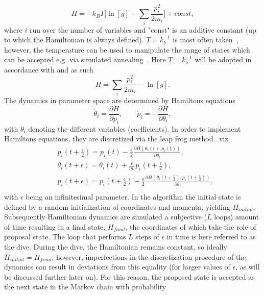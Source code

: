 \begin{equation}
	H=-k_BT\bigg[\ln[g]-\sum_{i}\frac{p_i^2}{2m_i}\bigg]+const,
\end{equation}
where $i$ run over the number of variables and "const" is an additive constant (up to which the Hamiltonian is always defined). $T=k_b^{-1}$ is most often taken~\citep{Neal2012}, however, the temperature can be used to manipulate the range of states which can be accepted e.g. via simulated annealing~\citep{MacKay2002}. Here $T=k_b^{-1}$ will be adopted in accordance with \citep{Neal:1996,Neal2012} and as such
\begin{equation}
	H=\sum_{i}\frac{p_i^2}{2m_i}-\ln[g].
\end{equation}
The dynamics in parameter space are determined by Hamiltons equations
\begin{equation}
	\dot{\theta}_i=\frac{\partial H}{\partial p_i},\qquad \dot{p}_i=-\frac{\partial H}{\partial \theta_i},
\end{equation}
with $\theta_i$ denoting the different variables (coefficients). In order to implement Hamiltons equations, they are discretized via the leap frog method~\citep{Neal:1996,Neal2012} viz
\begin{equation}
	\begin{split}
		&p_i\left( t+\frac{\epsilon}{2}\right)=p_i(t)-\frac{\epsilon}{2}\frac{\partial H(\theta_i(t),p_i(t))}{\partial \theta_i},\\
		&\theta_i(t+\epsilon)=\theta_i(t)+\frac{\epsilon}{m_i}p_i\left(t+\frac{\epsilon}{2}\right),\\
		&p_i(t+\epsilon)=p_i\left(t+\frac{\epsilon}{2}\right)-\frac{\epsilon}{2}\frac{\partial H(\theta_i(t+\frac{\epsilon}{2}),p_i(t+\frac{\epsilon}{2}))}{\partial \theta_i},\\
	\end{split}
\end{equation}
with $\epsilon$ being an infinitesimal parameter. In the algorithm the initial state is defined by a random initialization of coordinates and momenta, yielding $H_{initial}$. Subsequently Hamiltonian dynamics are simulated a subjective ($L$ loops) amount of time resulting in a final state, $H_{final}$, the coordinates of which take the role of proposal state. The loop that performs $L$ steps of $\epsilon$ in time is here referred to as the dive. During the dive, the Hamiltonian remains constant, so ideally $H_{initial}=H_{final}$, however, imperfections in the discretization procedure of the dynamics can result in deviations from this equality (for larger values of $\epsilon$, as will be discussed further later on). For this reason, the proposed state is accepted as the next state in the Markov chain with probability
